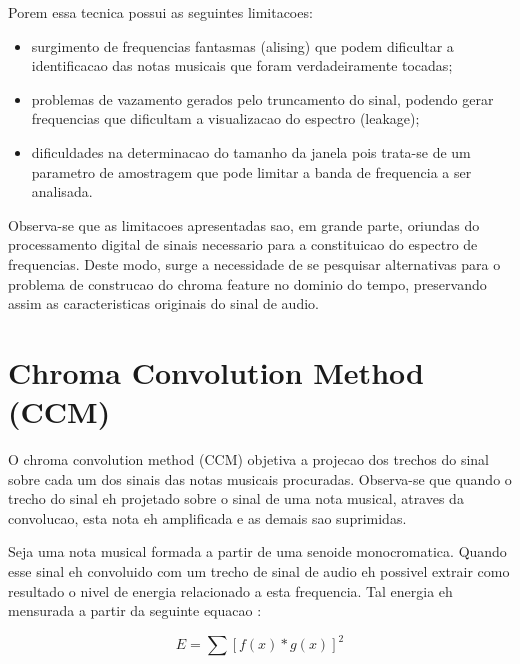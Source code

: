 \documentclass{article}
\begin{document}
	Porem essa tecnica possui as seguintes limitacoes:
	\begin{itemize}
		\item surgimento de frequencias fantasmas (alising) que podem dificultar a identificacao das notas musicais que foram verdadeiramente tocadas;
		\item problemas de vazamento gerados pelo truncamento do sinal, podendo gerar frequencias que dificultam a visualizacao do espectro (leakage);
		\item dificuldades na determinacao do tamanho da janela pois trata-se de um parametro de amostragem que pode limitar a banda de frequencia a ser analisada.
	\end{itemize}

	Observa-se que as limitacoes apresentadas sao, em grande parte, oriundas do processamento digital de sinais necessario para a constituicao do espectro de frequencias. Deste modo, surge a necessidade de se pesquisar alternativas para o problema de construcao do chroma feature no dominio do tempo, preservando assim as caracteristicas originais do sinal de audio.

\section{Chroma Convolution Method (CCM)}\label{sec:ccm}

	O chroma convolution method (CCM) objetiva a projecao dos trechos do sinal sobre cada um dos sinais das notas musicais procuradas. Observa-se que quando o trecho do sinal eh projetado sobre o sinal de uma nota musical, atraves da convolucao, esta nota eh amplificada e as demais sao suprimidas.

	Seja uma nota musical formada a partir de uma senoide monocromatica. Quando esse sinal eh convoluido com um trecho de sinal de audio eh possivel extrair como resultado o nivel de energia relacionado a esta frequencia. Tal energia eh mensurada a partir da seguinte equacao :

	\begin{equation}\label{ccm_equation}
		E = \sum [f(x)*g(x)]^{2}
	\end{equation}
\end{document}
